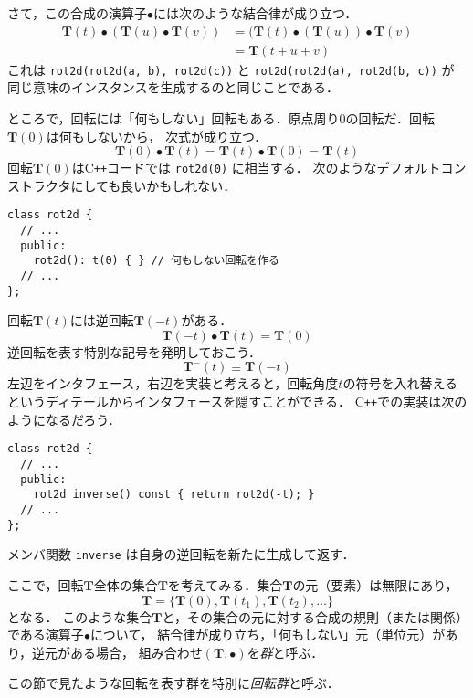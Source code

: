 \documentclass{jsbook}
\newcommand{\cxx}{\textrm{C}\texttt{++}}
\newcommand{\ccode}[1]{\texttt{#1}}
\newcommand{\keyword}[1]{\emph{#1}}
\newcommand{\bop}[1]{\boldsymbol{#1}}
\newcommand{\bg}[1]{\mathbf{#1}}
\begin{document}
さて，この合成の演算子$\bullet$には次のような結合律が成り立つ．
\begin{align}
\bop{T}(t)\bullet(\bop{T}(u)\bullet\bop{T}(v))&=(\bop{T}(t)\bullet(\bop{T}(u))\bullet\bop{T}(v)\\
  &=\bop{T}(t+u+v)
\end{align}
これは \ccode{rot2d(rot2d(a, b), rot2d(c))} と \ccode{rot2d(rot2d(a), rot2d(b, c))} が
同じ意味のインスタンスを生成するのと同じことである．

ところで，回転には「何もしない」回転もある．原点周り$0$の回転だ．回転$\bop{T}(0)$は何もしないから，
次式が成り立つ．
\begin{equation}
\bop{T}(0)\bullet\bop{T}(t)=\bop{T}(t)\bullet\bop{T}(0)=\bop{T}(t)
\end{equation}
回転$\bop{T}(0)$は\cxx コードでは \ccode{rot2d(0)} に相当する．
次のようなデフォルトコンストラクタにしても良いかもしれない．
\begin{verbatim}
class rot2d {
  // ...
  public:
    rot2d(): t(0) { } // 何もしない回転を作る
  // ...
};
\end{verbatim}

回転$\bop{T}(t)$には逆回転$\bop{T}(-t)$がある．
\begin{equation}
\bop{T}(-t)\bullet\bop{T}(t)=\bop{T}(0)
\end{equation}
逆回転を表す特別な記号を発明しておこう．
\begin{equation}
\bop{T}^{-}(t)\equiv\bop{T}(-t)
\end{equation}
左辺をインタフェース，右辺を実装と考えると，回転角度$t$の符号を入れ替えるというディテールからインタフェースを隠すことができる．
\cxx での実装は次のようになるだろう．
\begin{verbatim}
class rot2d {
  // ...
  public:
    rot2d inverse() const { return rot2d(-t); }
  // ...
};
\end{verbatim}
メンバ関数 \ccode{inverse} は自身の逆回転を新たに生成して返す．

ここで，回転$\bop{T}$全体の集合$\bg{T}$を考えてみる．集合$\bg{T}$の元（要素）は無限にあり，
\begin{equation}
\bg{T}=\{\bop{T}(0),\bop{T}(t_1),\bop{T}(t_2),\dots\}
\end{equation}
となる．
このような集合$\bg{T}$と，その集合の元に対する合成の規則（または関係）である演算子$\bullet$について，
結合律が成り立ち，「何もしない」元（単位元）があり，逆元がある場合，
組み合わせ$(\bg{T},\bullet)$を\keyword{群}と呼ぶ．

この節で見たような回転を表す群を特別に\keyword{回転群}と呼ぶ．
\end{document}
